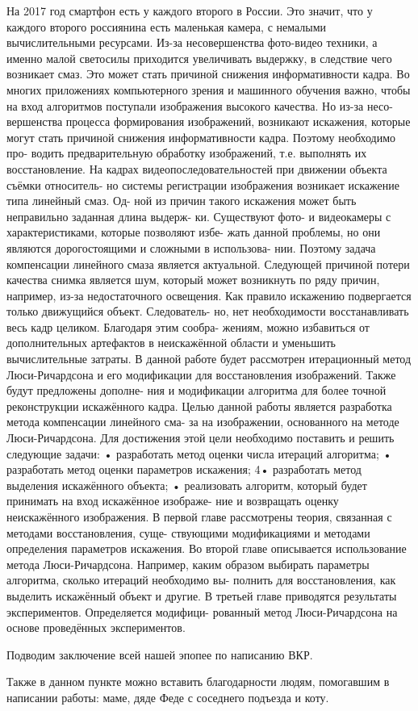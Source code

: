 \documentclass[13pt, bachelor, substylefile = bachelor.rtx]{disser}%
\begin{document}
На 2017 год смартфон есть у каждого второго в России.\cite{mobileUsers} Это значит, что у каждого второго россиянина есть маленькая камера, с немалыми вычислительными ресурсами. Из-за несовершенства фото-видео техники, а именно малой светосилы приходится увеличивать выдержку, в следствие чего возникает смаз. Это может стать причиной снижения информативности кадра.
Во многих приложениях компьютерного зрения и машинного обучения важно,
чтобы на вход алгоритмов поступали изображения высокого качества. Но из-за несо-
вершенства процесса формирования изображений, возникают искажения, которые
могут стать причиной снижения информативности кадра. Поэтому необходимо про-
водить предварительную обработку изображений, т.е. выполнять их восстановление.
На кадрах видеопоследовательностей при движении объекта съёмки относитель-
но системы регистрации изображения возникает искажение типа линейный смаз. Од-
ной из причин такого искажения может быть неправильно заданная длина выдерж-
ки. Существуют фото- и видеокамеры с характеристиками, которые позволяют избе-
жать данной проблемы, но они являются дорогостоящими и сложными в использова-
нии. Поэтому задача компенсации линейного смаза является актуальной. Следующей
причиной потери качества снимка является шум, который может возникнуть по ряду
причин, например, из-за недостаточного освещения.
Как правило искажению подвергается только движущийся объект. Следователь-
но, нет необходимости восстанавливать весь кадр целиком. Благодаря этим сообра-
жениям, можно избавиться от дополнительных артефактов в неискажённой области
и уменьшить вычислительные затраты.
В данной работе будет рассмотрен итерационный метод Люси-Ричардсона и его
модификации для восстановления изображений. Также будут предложены дополне-
ния и модификации алгоритма для более точной реконструкции искажённого кадра.
Целью данной работы является разработка метода компенсации линейного сма-
за на изображении, основанного на методе Люси-Ричардсона. Для достижения этой
цели необходимо поставить и решить следующие задачи:
• разработать метод оценки числа итераций алгоритма;
• разработать метод оценки параметров искажения;
4• разработать метод выделения искажённого объекта;
• реализовать алгоритм, который будет принимать на вход искажённое изображе-
ние и возвращать оценку неискажённого изображения.
В первой главе рассмотрены теория, связанная с методами восстановления, суще-
ствующими модификациями и методами определения параметров искажения.
Во второй главе описывается использование метода Люси-Ричардсона. Например,
каким образом выбирать параметры алгоритма, сколько итераций необходимо вы-
полнить для восстановления, как выделить искажённый объект и другие.
В третьей главе приводятся результаты экспериментов. Определяется модифици-
рованный метод Люси-Ричардсона на основе проведённых экспериментов.



\conclusion

Подводим заключение всей нашей эпопее по написанию ВКР.

Также в данном пункте можно вставить благодарности людям, помогавшим в написании работы: маме, дяде Феде с соседнего подъезда и коту.



\end{document}
